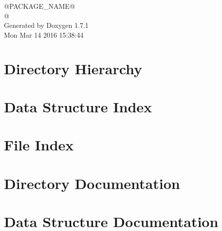 \documentclass[a4paper]{book}
\begin{document}
\begin{titlepage}
\vspace*{7cm}
\begin{center}
{\Large @PACKAGE\_\-NAME@ \\[1ex]\large @ }\\
\vspace*{1cm}
{\large Generated by Doxygen 1.7.1}\\
\vspace*{0.5cm}
{\small Mon Mar 14 2016 15:38:44}\\
\end{center}
\end{titlepage}
\clearemptydoublepage
{}
\tableofcontents
\clearemptydoublepage
{}
\chapter{Directory Hierarchy}

\chapter{Data Structure Index}

\chapter{File Index}

\chapter{Directory Documentation}

\chapter{Data Structure Documentation}












































\end{document}
